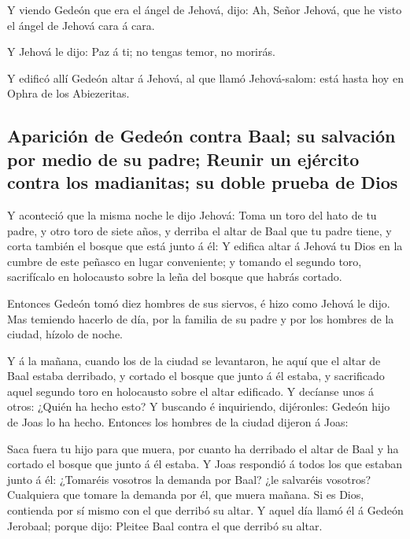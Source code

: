  Y viendo Gedeón que era el ángel de Jehová, dijo: Ah,
Señor Jehová, que he visto el ángel de Jehová cara á cara.

 Y Jehová le dijo: Paz á ti; no tengas temor, no morirás.

 Y edificó allí Gedeón altar á Jehová, al que llamó
Jehová-salom: está hasta hoy en Ophra de los Abiezeritas.

\hypertarget{apariciuxf3n-de-gedeuxf3n-contra-baal-su-salvaciuxf3n-por-medio-de-su-padre-reunir-un-ejuxe9rcito-contra-los-madianitas-su-doble-prueba-de-dios}{%
\subsection{Aparición de Gedeón contra Baal; su salvación por medio de
su padre; Reunir un ejército contra los madianitas; su doble prueba de
Dios}\label{apariciuxf3n-de-gedeuxf3n-contra-baal-su-salvaciuxf3n-por-medio-de-su-padre-reunir-un-ejuxe9rcito-contra-los-madianitas-su-doble-prueba-de-dios}}

 Y aconteció que la misma noche le dijo Jehová: Toma un
toro del hato de tu padre, y otro toro de siete años, y derriba el altar
de Baal que tu padre tiene, y corta también el bosque que está junto á
él:  Y edifica altar á Jehová tu Dios en la cumbre de
este peñasco en lugar conveniente; y tomando el segundo toro,
sacrifícalo en holocausto sobre la leña del bosque que habrás cortado.

 Entonces Gedeón tomó diez hombres de sus siervos, é hizo
como Jehová le dijo. Mas temiendo hacerlo de día, por la familia de su
padre y por los hombres de la ciudad, hízolo de noche.

 Y á la mañana, cuando los de la ciudad se levantaron, he
aquí que el altar de Baal estaba derribado, y cortado el bosque que
junto á él estaba, y sacrificado aquel segundo toro en holocausto sobre
el altar edificado.  Y decíanse unos á otros: ¿Quién ha
hecho esto? Y buscando é inquiriendo, dijéronles: Gedeón hijo de Joas lo
ha hecho. Entonces los hombres de la ciudad dijeron á Joas:

 Saca fuera tu hijo para que muera, por cuanto ha
derribado el altar de Baal y ha cortado el bosque que junto á él estaba.
 Y Joas respondió á todos los que estaban junto á él:
¿Tomaréis vosotros la demanda por Baal? ¿le salvaréis vosotros?
Cualquiera que tomare la demanda por él, que muera mañana. Si es Dios,
contienda por sí mismo con el que derribó su altar.  Y
aquel día llamó él á Gedeón Jerobaal; porque dijo: Pleitee Baal contra
el que derribó su altar.

